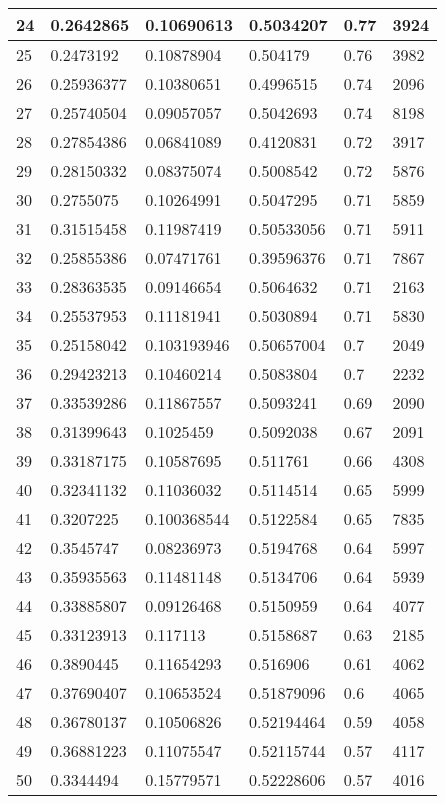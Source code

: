 \begin{longtable}{|l|l|l|l|l|l|}
24 & 0.2642865 & 0.10690613 & 0.5034207 & 0.77 & 3924 \\ \hline 
25 & 0.2473192 & 0.10878904 & 0.504179 & 0.76 & 3982 \\ \hline 
26 & 0.25936377 & 0.10380651 & 0.4996515 & 0.74 & 2096 \\ \hline 
27 & 0.25740504 & 0.09057057 & 0.5042693 & 0.74 & 8198 \\ \hline 
28 & 0.27854386 & 0.06841089 & 0.4120831 & 0.72 & 3917 \\ \hline 
29 & 0.28150332 & 0.08375074 & 0.5008542 & 0.72 & 5876 \\ \hline 
30 & 0.2755075 & 0.10264991 & 0.5047295 & 0.71 & 5859 \\ \hline 
31 & 0.31515458 & 0.11987419 & 0.50533056 & 0.71 & 5911 \\ \hline 
32 & 0.25855386 & 0.07471761 & 0.39596376 & 0.71 & 7867 \\ \hline 
33 & 0.28363535 & 0.09146654 & 0.5064632 & 0.71 & 2163 \\ \hline 
34 & 0.25537953 & 0.11181941 & 0.5030894 & 0.71 & 5830 \\ \hline 
35 & 0.25158042 & 0.103193946 & 0.50657004 & 0.7 & 2049 \\ \hline 
36 & 0.29423213 & 0.10460214 & 0.5083804 & 0.7 & 2232 \\ \hline 
37 & 0.33539286 & 0.11867557 & 0.5093241 & 0.69 & 2090 \\ \hline 
38 & 0.31399643 & 0.1025459 & 0.5092038 & 0.67 & 2091 \\ \hline 
39 & 0.33187175 & 0.10587695 & 0.511761 & 0.66 & 4308 \\ \hline 
40 & 0.32341132 & 0.11036032 & 0.5114514 & 0.65 & 5999 \\ \hline 
41 & 0.3207225 & 0.100368544 & 0.5122584 & 0.65 & 7835 \\ \hline 
42 & 0.3545747 & 0.08236973 & 0.5194768 & 0.64 & 5997 \\ \hline 
43 & 0.35935563 & 0.11481148 & 0.5134706 & 0.64 & 5939 \\ \hline 
44 & 0.33885807 & 0.09126468 & 0.5150959 & 0.64 & 4077 \\ \hline 
45 & 0.33123913 & 0.117113 & 0.5158687 & 0.63 & 2185 \\ \hline 
46 & 0.3890445 & 0.11654293 & 0.516906 & 0.61 & 4062 \\ \hline 
47 & 0.37690407 & 0.10653524 & 0.51879096 & 0.6 & 4065 \\ \hline 
48 & 0.36780137 & 0.10506826 & 0.52194464 & 0.59 & 4058 \\ \hline 
49 & 0.36881223 & 0.11075547 & 0.52115744 & 0.57 & 4117 \\ \hline 
50 & 0.3344494 & 0.15779571 & 0.52228606 & 0.57 & 4016 \\ \hline 
\end{longtable}